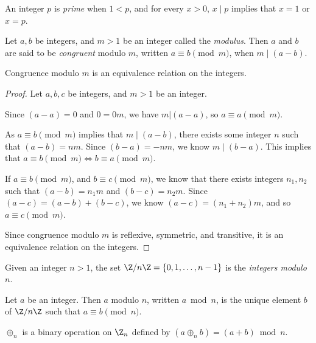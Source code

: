 \documentclass[12pt]{article}
\begin{document}
\begin{defn}
    An integer $p$ is \emph{prime} when $1 < p$, and for every $x > 0$, $x \mid p$ implies that $x = 1$ or $x = p$.
\end{defn}

\begin{defn}\label{modular-congruence}
    Let $a, b$ be integers, and $m > 1$ be an integer called the \emph{modulus}. Then $a$ and $b$ are said to be \emph{congruent} modulo $m$, written $a \equiv b \pmod m$, when $m\mid(a - b)$.
\end{defn}

\begin{thm}\label{modular-congruence-equivalence}
    Congruence modulo $m$ is an equivalence relation on the integers.
\end{thm}

\begin{proof} Let $a, b, c$ be integers, and $m > 1$ be an integer.

    Since $(a-a) = 0$ and $0 = 0m$, we have $m|(a-a)$, so $a \equiv a \pmod m$.

    As $a \equiv b \pmod m$ implies that $m\mid(a - b)$, there exists some integer $n$ such that $(a - b) = nm$. Since $(b - a) = -nm$, we know $m\mid(b-a)$. This implies that $a \equiv b \pmod m \iff b \equiv a \pmod m$.

    If $a \equiv b \pmod m$, and $b \equiv c \pmod m$, we know that there exists integers $n_1, n_2$ such that $(a-b) = n_1m$ and $(b-c) = n_2m$. Since $(a-c) = (a-b) + (b-c)$, we know $(a-c) = (n_1 + n_2)m$, and so $a \equiv c \pmod m$.

    Since congruence modulo $m$ is reflexive, symmetric, and transitive, it is an equivalence relation on the integers.
\end{proof}

\begin{defn}\label{mod-n}
    Given an integer $n > 1$, the set $\Z/n\Z = \{0, 1, \ldots, n-1\}$ is the \emph{integers modulo $n$}.
\end{defn}

\begin{defn}\label{modulo}
    Let $a$ be an integer. Then $a$ modulo $n$, written $a \bmod n$, is the unique element $b$ of $\Z/n\Z$ such that $a \equiv b \pmod n$.
\end{defn}

\begin{defn}
    $\oplus_n$ is a binary operation on $\Z_n$ defined by $(a \oplus_n b) = (a + b)\bmod n$.
\end{defn}
\end{document}
